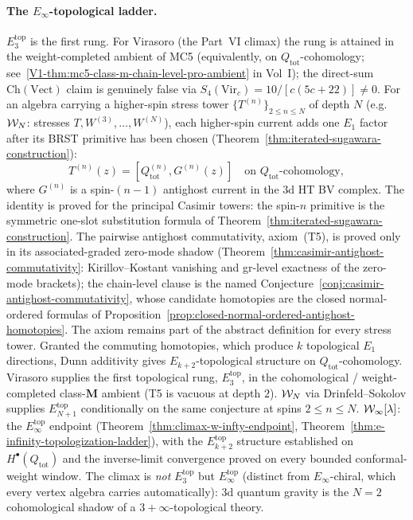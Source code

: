 \paragraph{The $E_\infty$-topological ladder.}
$E_3^{\mathrm{top}}$ is the first rung. For Virasoro (the Part~VI
climax) the rung is attained in the weight-completed ambient of
MC5 (equivalently, on $Q_{\mathrm{tot}}$-cohomology;
see~\ref{V1-thm:mc5-class-m-chain-level-pro-ambient} in Vol~I);
the direct-sum $\mathrm{Ch}(\mathrm{Vect})$ claim is genuinely
false via $S_4(\mathrm{Vir}_c) = 10/[c(5c+22)] \neq 0$. For an
algebra carrying
a higher-spin stress tower $\{T^{(n)}\}_{2 \le n \le N}$ of
depth $N$ (e.g.\ $\mathcal{W}_N$: stresses $T, W^{(3)}, \ldots, W^{(N)}$),
each higher-spin current adds one $E_1$ factor after its BRST
primitive has been chosen
(Theorem~\ref{thm:iterated-sugawara-construction}):
\[
T^{(n)}(z) = [Q_{\mathrm{tot}}^{(n)}, G^{(n)}(z)]
\quad \text{on } Q_{\mathrm{tot}}\text{-cohomology},
\]
where $G^{(n)}$ is a spin-$(n{-}1)$ antighost current in the 3d HT BV
complex. The identity is proved for the principal Casimir towers: the
spin-$n$ primitive is the symmetric one-slot substitution formula of
Theorem~\ref{thm:iterated-sugawara-construction}. The pairwise
antighost commutativity, axiom~(T5), is proved only in its
associated-graded zero-mode shadow
(Theorem~\ref{thm:casimir-antighost-commutativity}: Kirillov--Kostant
vanishing and gr-level exactness of the zero-mode brackets); the
chain-level clause is the named
Conjecture~\ref{conj:casimir-antighost-commutativity}, whose
candidate homotopies are the closed normal-ordered formulas of
Proposition~\ref{prop:closed-normal-ordered-antighost-homotopies}.
The axiom remains part of the abstract definition for every stress
tower. Granted the commuting homotopies, which produce
$k$ topological $E_1$ directions, Dunn additivity gives
$E_{k+2}$-topological structure on $Q_{\mathrm{tot}}$-cohomology.
Virasoro supplies the first
topological rung, $E_3^{\mathrm{top}}$, in the cohomological /
weight-completed class-$\mathbf M$ ambient (T5 is vacuous at depth
$2$). $\mathcal{W}_N$ via
Drinfeld--Sokolov supplies $E_{N+1}^{\mathrm{top}}$ conditionally on
the same conjecture at spins $2\leq n\leq N$.
$\mathcal{W}_\infty[\lambda]$: the $E_\infty^{\mathrm{top}}$ endpoint
(Theorem~\ref{thm:climax-w-infty-endpoint},
Theorem~\ref{thm:e-infinity-topologization-ladder}), with the
$E_{k+2}^{\mathrm{top}}$ structure established on
$H^\bullet(Q_{\mathrm{tot}})$ and the inverse-limit convergence proved
on every bounded conformal-weight window. The climax is \emph{not} $E_3^{\mathrm{top}}$
but $E_\infty^{\mathrm{top}}$ (distinct from $E_\infty$-chiral, which
every vertex algebra carries automatically): 3d quantum gravity is the
$N = 2$ cohomological shadow of a $3{+}\infty$-topological theory.

